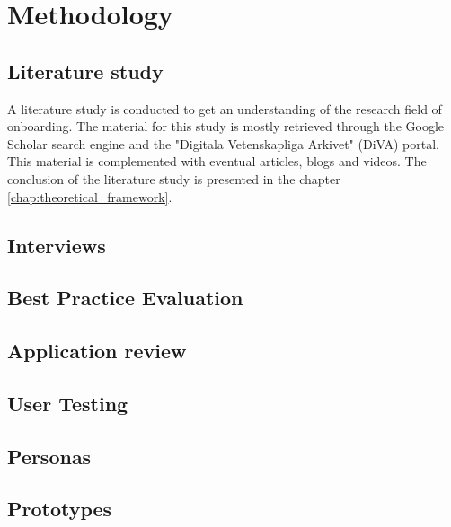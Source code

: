 \chapter{Methodology}
\label{chap:methodology}

\section{Literature study}
A literature study is conducted to get an understanding of the research field of onboarding. The material for this study is mostly retrieved through the Google Scholar search engine and the "Digitala Vetenskapliga Arkivet" (DiVA) portal. This material is complemented with eventual articles, blogs and videos. The conclusion of the literature study is presented in the chapter \ref{chap:theoretical_framework}.

\section{Interviews}
%
\section{Best Practice Evaluation}
%
\section{Application review}
%
\section{User Testing}
%
\section{Personas}
%
\section{Prototypes}
